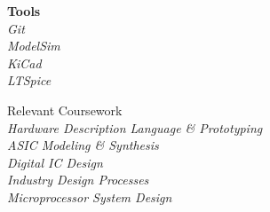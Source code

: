 \documentclass{article}
\newcommand\leftcolwidthvar{0.35}
\begin{document}
{\begin{minipage}[t]{\leftcolwidthvar \textwidth}
\begin{flushleft}
\textbf{Tools\\\vspace{2pt}}
\textsf{\textit{%
Git\\\vspace{2pt}
ModelSim\\\vspace{2pt}
KiCad\\\vspace{2pt}
LTSpice\\\vspace{2pt}}}
\end{flushleft}
%
%
\vspace{0.5ex}
\begin{flushleft}
\textsf{\Large Relevant Coursework}\\
\medskip
\textsf{\textit{%
Hardware Description Language \& Prototyping\\\vspace{4pt}
ASIC Modeling \& Synthesis\\\vspace{4pt}
Digital IC Design\\\vspace{4pt}
Industry Design Processes\\\vspace{4pt}
Microprocessor System Design\\\vspace{4pt}}}
\end{flushleft}
\end{minipage}}
\hfill
%
%
\end{document}
